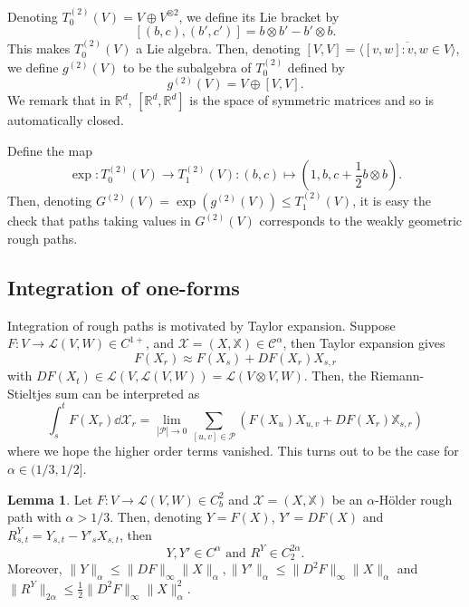 \documentclass[]{article}
\theoremstyle{definition}
\theoremstyle{definition}
\newtheorem{lemma}{Lemma}[section]
\begin{document}
Denoting \(T^{(2)}_0(V) = V \oplus V^{\otimes 2}\), we define its Lie bracket by 
\[[(b, c), (b', c')] = b \otimes b' - b' \otimes b.\]
This makes \(T^{(2)}_0(V)\) a Lie algebra. Then, denoting \([V, V] = \overline{\langle [v, w] : v, w \in V\rangle}\),
we define \(g^{(2)}(V)\) to be the subalgebra of \(T^{(2)}_0\) defined by 
\[g^{(2)}(V) = V \oplus [V, V].\]
We remark that in \(\mathbb{R}^d\), \([\mathbb{R}^d, \mathbb{R}^d]\) is the space of symmetric matrices 
and so is automatically closed.

Define the map 
\[\exp : T^{(2)}_0(V) \to T^{(2)}_1(V) : (b, c) \mapsto \left(1, b, c + \frac{1}{2}b \otimes b\right).\]
Then, denoting \(G^{(2)}(V) = \exp(g^{(2)}(V)) \le T^{(2)}_1(V)\), it is easy the check that paths 
taking values in \(G^{(2)}(V)\) corresponds to the weakly geometric rough paths.

\subsection*{Integration of one-forms}

Integration of rough paths is motivated by Taylor expansion. Suppose \(F : V \to \mathcal{L}(V, W) \in C^{1 +}\), and 
\(\mathcal{X} = (X, \mathbb{X}) \in \mathcal{C}^\alpha\), then Taylor expansion gives
\[F(X_r) \approx F(X_s) + DF(X_r)X_{s, r}\]
with \(DF(X_t) \in \mathcal{L}(V, \mathcal{L}(V, W)) = \mathcal{L}(V \otimes V, W)\). Then, the Riemann-Stieltjes 
sum can be interpreted as 
\begin{equation}\label{eq:rs-sum}
  \int_s^t F(X_r) \dd \mathcal{X}_r = 
  \lim_{|\mathcal{P}| \to 0} \sum_{[u, v] \in \mathcal{P}} \left(F(X_u)X_{u, v} + DF(X_r)\mathbb{X}_{s, r}\right)
\end{equation}
where we hope the higher order terms vanished. This turns out to be the case for \(\alpha \in (1/3, 1/2]\).

\begin{lemma}\label{lem:control}
  Let \(F : V \to \mathcal{L}(V, W) \in C^2_b\) and \(\mathcal{X} = (X, \mathbb{X})\) be an \(\alpha\)-H\"older 
  rough path with \(\alpha > 1/3\).
  Then, denoting \(Y = F(X)\), \(Y' = DF(X)\) and \(R^Y_{s, t} = Y_{s, t} - Y'_s X_{s, t}\), then 
  \[Y, Y' \in C^\alpha \text{ and } R^Y \in C_2^{2\alpha}.\]
  Moreover, \(\|Y\|_\alpha \le \|DF\|_\infty\|X\|_\alpha, \|Y'\|_\alpha \le \|D^2F\|_\infty\|X\|_\alpha\) 
  and \(\|R^Y\|_{2\alpha} \le \frac{1}{2}\|D^2F\|_\infty\|X\|_\alpha^2\).
\end{lemma}
\end{document}
